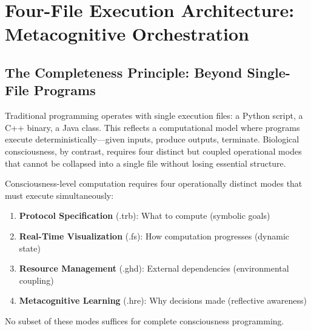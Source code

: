 \section{Four-File Execution Architecture: Metacognitive Orchestration}

\subsection{The Completeness Principle: Beyond Single-File Programs}

Traditional programming operates with single execution files: a Python script, a C++ binary, a Java class. This reflects a computational model where programs execute deterministically—given inputs, produce outputs, terminate. Biological consciousness, by contrast, requires four distinct but coupled operational modes that cannot be collapsed into a single file without losing essential structure.

\begin{theorem}
\label{thm:four_mode_necessity}
Consciousness-level computation requires four operationally distinct modes that must execute simultaneously:

\begin{enumerate}
\item \textbf{Protocol Specification} (.trb): What to compute (symbolic goals)
\item \textbf{Real-Time Visualization} (.fs): How computation progresses (dynamic state)
\item \textbf{Resource Management} (.ghd): External dependencies (environmental coupling)
\item \textbf{Metacognitive Learning} (.hre): Why decisions made (reflective awareness)
\end{enumerate}

No subset of these modes suffices for complete consciousness programming.
\end{theorem}

